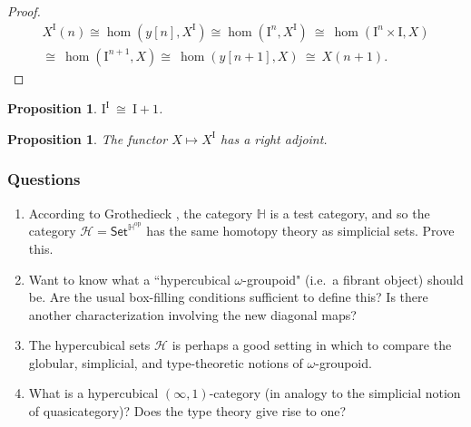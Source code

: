 \documentclass[11pt]{article}
\newcommand{\psh}[1]{\ensuremath{\mathsf{Set}^{#1^{\mathrm{op}}}}}
\newcommand{\I}{\ensuremath{\mathrm{I}}}
\renewcommand{\H}{\ensuremath{\mathbb{H}}}
\newcommand{\HH}{\ensuremath{\mathcal{H}}}
\newtheorem{proposition}[theorem]{Proposition}
\theoremstyle{remark}
\theoremstyle{definition}
\begin{document}
\begin{proof}
\[
\begin{split}
X^\I(n) \cong \hom(y[n], X^\I) \cong \hom(\I^n, X^\I)\ \cong\ \hom(\I^n\times \I, X)\\
\cong\ \hom(\I^{n+1}, X)\cong\ \hom(y[n+1], X)\ \cong\ X(n+1).
\end{split}
\]
\end{proof}

\begin{proposition}
\quad $\I^\I\ \cong\ \I+1$.
\end{proposition}


\begin{proposition}
The functor $X \mapsto X^\I$ has a \emph{right} adjoint.
\end{proposition}


\subsubsection*{Questions}
\begin{enumerate}
\item According to Grothedieck \cite{PS}, the category $\H$ is a test category, and so the category $\HH = \psh{\H}$ has the same homotopy theory as simplicial sets.  Prove this.

\item Want to know what a ``hypercubical $\omega$-groupoid" (i.e.\ a fibrant object) should be.  Are the usual box-filling conditions sufficient to define this? Is there another characterization involving the new diagonal maps?

\item The hypercubical sets $\HH$ is perhaps a good setting in which to compare the globular, simplicial, and type-theoretic notions of $\omega$-groupoid.

\item What is a hypercubical $(\infty, 1)$-category (in analogy to the simplicial notion of quasicategory)?  Does the type theory give rise to one?

\end{enumerate}
\end{document}
